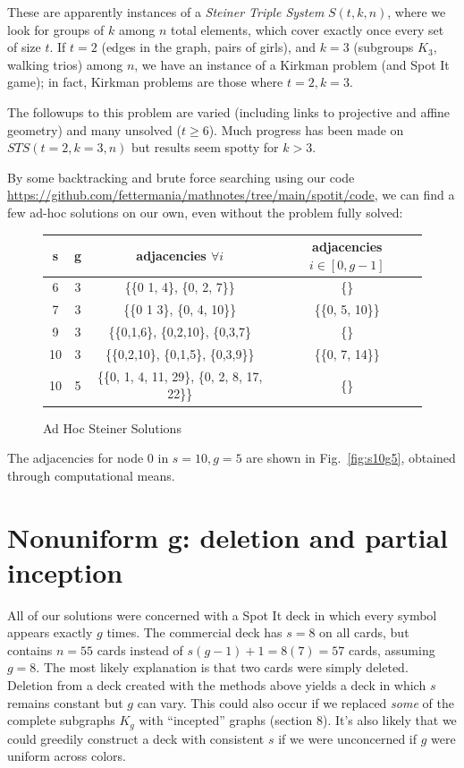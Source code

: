 \documentclass[11pt, oneside]{article} 	%
\begin{document}
These are apparently instances of a \emph{Steiner Triple System} $S(t, k, n)$\cite{6}, where we look for groups of $k$ among $n$ total elements, which cover exactly once every set of size $t$. If $t=2$ (edges in the graph, pairs of girls), and $k=3$ (subgroups $K_3$, walking trios) among $n$, we have an instance of a Kirkman problem (and Spot It game); in fact, Kirkman problems are those where $t=2, k=3$.

The followups to this problem are varied (including links to projective and affine geometry) and many unsolved ($t \geq 6$). Much progress has been made on $STS(t=2,k=3,n)$ but results seem spotty for $k>3$.

By some backtracking and brute force searching using our code \url{https://github.com/fettermania/mathnotes/tree/main/spotit/code}, we can find a few ad-hoc solutions on our own, even without the problem fully solved:



\begin{figure}[!htb]
\centering
 \centering
 \begin{tabular}{c c | c | c }
  s & g & adjacencies $\forall i$ & adjacencies $i \in [0, g-1]$ \\
\hline
  6 & 3 & \{\{0 1, 4\}, \{0, 2, 7\}\} & \{\}\\
  7 & 3 & \{\{0 1 3\}, \{0, 4, 10\}\} & \{\{0, 5, 10\}\} \\
  9 & 3 & \{\{0,1,6\}, \{0,2,10\}, \{0,3,7\} & \{\} \\
  10 & 3 & \{\{0,2,10\}, \{0,1,5\}, \{0,3,9\}\} & \{\{0, 7, 14\}\} \\
  10 & 5 & \{\{0, 1, 4, 11, 29\}, \{0, 2, 8, 17, 22\}\} & \{\} \\
  \end{tabular}
 \caption{Ad Hoc Steiner Solutions }
\label{fig:ad-hoc-steiner}
\end{figure}

The adjacencies for node 0 in $s=10, g=5$ are shown in Fig.~\ref{fig:s10g5}, obtained through computational means.

\section{Nonuniform g: deletion and partial inception}

All of our solutions were concerned with a Spot It deck in which every symbol appears exactly $g$ times. The commercial deck has $s=8$ on all cards, but contains $n=55$ cards instead of $s(g-1) +1 = 8(7) = 57$ cards, assuming $g=8$. The most likely explanation is that two cards were simply deleted. Deletion from a deck created with the methods above yields a deck in which $s$ remains constant but $g$ can vary. This could also occur if we replaced \emph{some} of the complete subgraphs $K_g$ with ``incepted'' graphs (section 8). It's also likely that we could greedily construct a deck with consistent $s$ if we were unconcerned if $g$ were uniform across colors.
\end{document}
